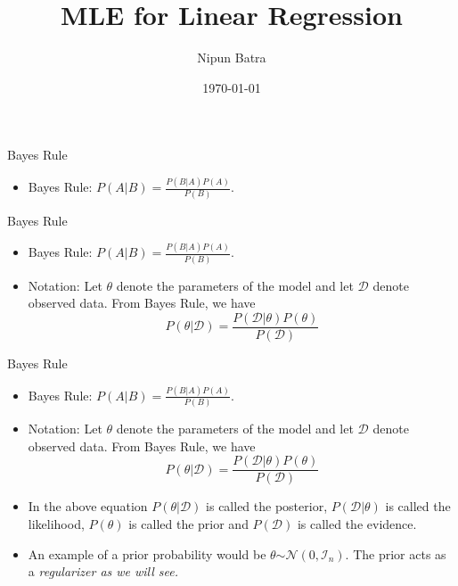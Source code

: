 \documentclass{beamer}
\title{MLE for Linear Regression}
\date{\today}
\author{Nipun Batra}
\institute{IIT Gandhinagar}
\begin{document}
\maketitle
\begin{frame}{Bayes Rule}
\begin{itemize}
	\item Bayes Rule: $P(A | B) = \frac{P(B|A)P(A)}{P(B)}$.

	
\end{itemize}
\end{frame}

\begin{frame}{Bayes Rule}
\begin{itemize}
	\item Bayes Rule: $P(A | B) = \frac{P(B|A)P(A)}{P(B)}$.
	\item Notation: Let $\theta$ denote the parameters of the model and let $\mathcal{D}$ denote observed data. From Bayes Rule, we have 
	\begin{equation*}
	    P(\theta | \mathcal{D}) = \frac{ P(\mathcal{D}|\theta)P(\theta) }{P(\mathcal{D})}
	\end{equation*}
	
\end{itemize}
\end{frame}

\begin{frame}{Bayes Rule}
\begin{itemize}
	\item Bayes Rule: $P(A | B) = \frac{P(B|A)P(A)}{P(B)}$.
	\item Notation: Let $\theta$ denote the parameters of the model and let $\mathcal{D}$ denote observed data. From Bayes Rule, we have 
	\begin{equation*}
	    P(\theta | \mathcal{D}) = \frac{ P(\mathcal{D}|\theta)P(\theta) }{P(\mathcal{D})}
	\end{equation*}
	\item In the above equation $P(\theta | \mathcal{D})$ is called the posterior, $P(\mathcal{D}|\theta)$ is called the likelihood, $P(\theta)$ is called the prior and $P(\mathcal{D})$ is called the evidence.
	\item An example of a prior probability would be $\theta \stackrel{}{\sim} \mathcal{N}(0, \mathcal{I}_n)$. The prior acts as a \textit{regularizer as we will see.}
	
\end{itemize}
\end{frame}
\end{document}

